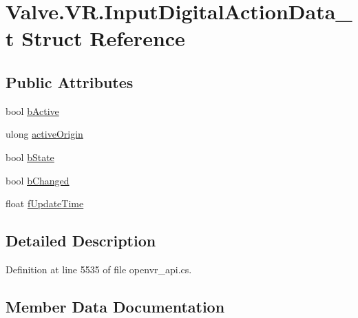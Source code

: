 \hypertarget{struct_valve_1_1_v_r_1_1_input_digital_action_data__t}{}\section{Valve.\+V\+R.\+Input\+Digital\+Action\+Data\+\_\+t Struct Reference}
\label{struct_valve_1_1_v_r_1_1_input_digital_action_data__t}
\subsection*{Public Attributes}
\begin{DoxyCompactItemize}
\item 
bool \mbox{\hyperlink{struct_valve_1_1_v_r_1_1_input_digital_action_data__t_a9bffe21303b0f3347edd447e6af523bc}{b\+Active}}
\item 
ulong \mbox{\hyperlink{struct_valve_1_1_v_r_1_1_input_digital_action_data__t_a7d31dee38389810cdc2262b2b4d5bffc}{active\+Origin}}
\item 
bool \mbox{\hyperlink{struct_valve_1_1_v_r_1_1_input_digital_action_data__t_a2354a78500c9d65c0a1e693a27c6434f}{b\+State}}
\item 
bool \mbox{\hyperlink{struct_valve_1_1_v_r_1_1_input_digital_action_data__t_a2b0e328a30629fb876fc99e7f288e199}{b\+Changed}}
\item 
float \mbox{\hyperlink{struct_valve_1_1_v_r_1_1_input_digital_action_data__t_a76175e07e07bb91c07bfb6153d82dbf7}{f\+Update\+Time}}
\end{DoxyCompactItemize}


\subsection{Detailed Description}


Definition at line 5535 of file openvr\+\_\+api.\+cs.



\subsection{Member Data Documentation}
\mbox{\label{struct_valve_1_1_v_r_1_1_input_digital_action_data__t_a7d31dee38389810cdc2262b2b4d5bffc}} 
